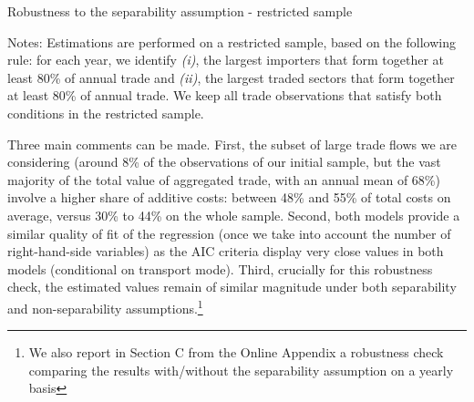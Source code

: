 \documentclass[a4paper,11pt]{article}
\begin{document}
\begin{table}[htbp]
	\centering
	\caption{Robustness to the separability assumption - restricted sample}
	\begin{center}
			
%			
	\end{center}
	\parbox[l]{12cm}{\footnotesize{Notes: Estimations are performed on a restricted sample, based on the following rule: for each year, we identify \textit{(i)}, the largest importers that form together at least 80\% of annual trade and \textit{(ii)}, the largest traded sectors that form together at least 80\% of annual trade. We keep all trade observations that satisfy both conditions in the restricted sample.}}
	\label{tab:robustness_separability}
\end{table}


Three main comments can be made. First, the subset of large trade flows we are considering (around 8\% of the observations of our initial sample, but the vast majority of the total value of aggregated trade, with an annual mean of 68\%) involve a higher share of additive costs: between 48\% and 55\% of total costs on average, versus 30\% to 44\% on the whole sample.
Second, both models provide a similar quality of fit of the regression (once we take into account the number of right-hand-side variables) as the AIC criteria display very close values in both models (conditional on transport mode).
Third, crucially for this robustness check, the estimated values remain of similar magnitude under both separability and non-separability assumptions.\footnote{We also report in Section C from the Online Appendix a robustness check comparing the results with/without the separability assumption on a yearly basis} %
\end{document}
